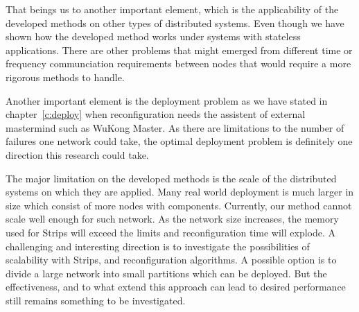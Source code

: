 That beings us to another important element, which is the applicability of the developed methods on other types of distributed systems. Even though we have shown how the developed method works under systems with stateless applications. There are other problems that might emerged from different time or frequency communciation requirements between nodes that would require a more rigorous methods to handle.

Another important element is the deployment problem as we have stated in chapter~\ref{c:deploy} when reconfiguration needs the assistent of external mastermind such as WuKong Master. As there are limitations to the number of failures one network could take, the optimal deployment problem is definitely one direction this research could take. 

The major limitation on the developed methods is the scale of the distributed systems on which they are applied. Many real world deployment is much larger in size which consist of more nodes with components. Currently, our method cannot scale well enough for such network. As the network size increases, the memory used for Strips will exceed the limits and reconfiguration time will explode. A challenging and interesting direction is to investigate the possibilities of scalability with Strips, and reconfiguration algorithms. A possible option is to divide a large network into small partitions which can be deployed. But the effectiveness, and to what extend this approach can lead to desired performance still remains something to be investigated.
